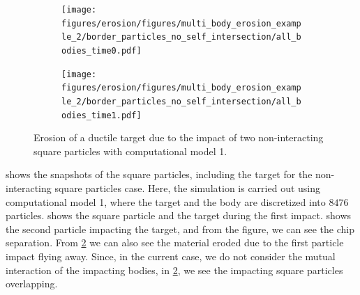 \begin{figure}[!htpb]
  \centering
  \begin{subfigure}{0.48\textwidth}
    \centering
    \texttt{[image: figures/erosion/figures/multi\_body\_erosion\_example\_2/border\_particles\_no\_self\_intersection/all\_bodies\_time0.pdf]}
    \subcaption{}
    \label{fig:mpe-2-border-a}
  \end{subfigure}
  \begin{subfigure}{0.48\textwidth}
    \centering
    \texttt{[image: figures/erosion/figures/multi\_body\_erosion\_example\_2/border\_particles\_no\_self\_intersection/all\_bodies\_time1.pdf]}
    \subcaption{}
    \label{fig:mpe-2-border-b}
  \end{subfigure}
  \caption{Erosion of a ductile target due to the impact of two non-interacting
    square particles with computational model 1.}
\label{fig:mpe-2-border}
\end{figure}
 shows the snapshots of the square particles, including
the target for the non-interacting square particles case. Here, the simulation is
carried out using computational model 1, where the target and the body are
discretized into $8476$ particles.  shows the square
particle and the target during the first impact.  shows
the second particle impacting the target, and from the figure, we can see the
chip separation. From \cref{fig:mpe-2-border-b} we can also see the material
eroded due to the first particle impact flying away. Since, in the current case,
we do not consider the mutual interaction of the impacting bodies, in
\cref{fig:mpe-2-border-b}, we see the impacting square particles overlapping.


